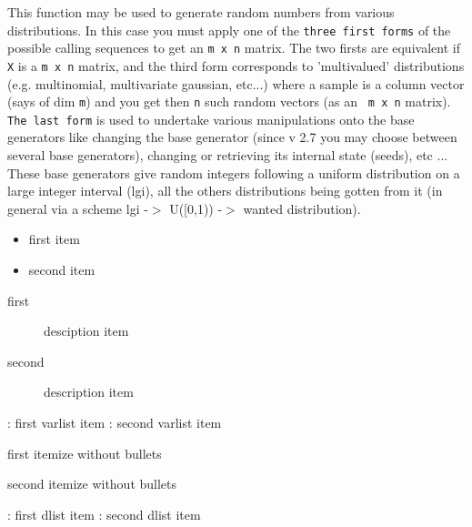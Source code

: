 \begin{mandescription}
  This function may be used to generate random numbers from various
  distributions. In this case you must apply one of the \verb!three first forms!
  of the possible calling sequences to get an \verb!m x n! matrix.  The two
  firsts are equivalent if \verb!X! is a \verb!m x n! matrix, and the third form
  corresponds to 'multivalued' distributions (e.g. multinomial, multivariate
  gaussian, etc...) where a sample is a column vector (says of dim \verb!m!)
  and you get then \verb!n! such random vectors (as an \verb! m x n! matrix).
  \verb!The last form! is used to undertake various manipulations onto the base
  generators like changing the base generator (since v 2.7 you may choose
  between several base generators), changing or retrieving its internal state
  (seeds), etc ... These base generators give random integers following a
  uniform distribution on a large integer interval (lgi), all the others
  distributions being gotten from it (in general via a scheme lgi -$>$ U([0,1))
  -$>$ wanted distribution).

  \begin{itemize}
  \item first item 
  \item second item 
  \end{itemize}

  \begin{description}
  \item[first] desciption item 
  \item[second] description item 
  \end{description}

  \begin{varlist}
    : first varlist item 
    : second varlist item
  \end{varlist}


  \begin{nbitemize}
    \item  first itemize without bullets 
    \item  second itemize without bullets
  \end{nbitemize}

  \begin{nbitemize}
    : first dlist item 
    : second dlist item
  \end{nbitemize}


\end{mandescription}

